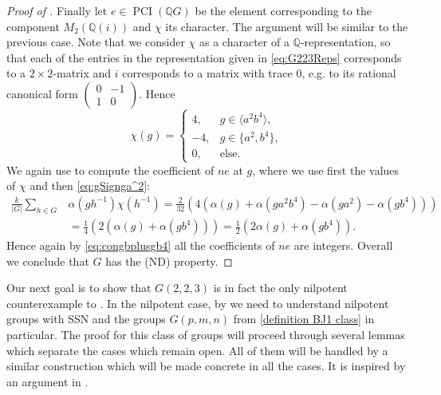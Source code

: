 \documentclass[a4paper,10pt]{amsart}
\theoremstyle{definition}
\theoremstyle{remark}
\newcommand\PCI{\operatorname{PCI}}
\newcommand{\Q}{{\mathbb Q}}
\begin{document}
\begin{proof}[Proof of ]
Finally let $e \in \PCI(\Q G)$ be the element corresponding to the component  $M_2(\Q (i))$ and $\chi$ its character. The argument will be similar to the previous case. Note that we consider $\chi$ as a character of a $\mathbb{Q}$-representation, so that each of the entries in the representation given in \eqref{eq:G223Reps} corresponds to a $2\times 2$-matrix and $i$ corresponds to a matrix with trace $0$, e.g. to its rational canonical form $\begin{pmatrix} 0 & -1 \\ 1 & 0 \end{pmatrix}$. Hence
\[ \chi(g) = \left\{ \begin{array}{lll} 4, & g \in \langle a^2b^4 \rangle, \\  -4, & g \in \{a^2, b^4 \}, \\ 0, & \text{else}. \end{array}\right.\]
We again use  to compute the coefficient of $ne$ at $g$, where we use first the values of $\chi$ and then \eqref{eq:gSignga^2}:
\begin{align*}
\frac{k}{|G|}\sum_{h \in G}&\alpha(gh^{-1})\chi(h^{-1}) = \frac{2}{32}\left(4(\alpha(g) + \alpha(ga^2b^4) - \alpha(ga^2) - \alpha(gb^4))\right) \\
&= \frac{1}{4}\left(2(\alpha(g) + \alpha(gb^4))\right) = \frac{1}{2}\left(2\alpha(g)+\alpha(gb^4)\right).
\end{align*}
Hence again by \eqref{eq:congbplusgb4} all the coefficients of $ne$ are integers.
Overall we conclude that $G$ has the (ND) property.
\end{proof}

Our next goal is to show that $G(2,2,3)$ is in fact the only nilpotent counterexample to . In the nilpotent case, by  we need to understand nilpotent groups with SSN and the groups $G(p,m,n)$ from \eqref{definition BJ1 class} in particular. 
The proof for this class of groups will proceed through several lemmas which separate the cases which remain open. All of them will be handled by a similar construction which will be made concrete in all the cases. It is inspired by an argument in \cite{Liu}.
\end{document}
